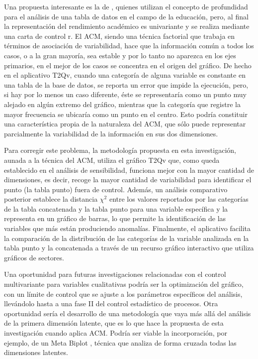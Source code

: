 \documentclass[mathematics,article,submit,moreauthors,pdftex]{mdpi}
\begin{document}
Una propuesta interesante es la de \citet{Saltos2020}, quienes utilizan
el concepto de profundidad para el análisis de una tabla de datos en el
campo de la educación, pero, al final la representación del rendimiento
académico es univariante y se realiza mediante una carta de control r.
El ACM, siendo una técnica factorial que trabaja en términos de
asociación de variabilidad, hace que la información común a todos los
casos, o a la gran mayoría, sea estable y por lo tanto no aparezca en
los ejes primarios, en el mejor de los casos se concentra en el origen
del gráfico. De hecho en el aplicativo T2Qv, cuando una categoría de
alguna variable es constante en una tabla de la base de datos, se
reporta un error que impide la ejecución, pero, si hay por lo menos un
caso diferente, éste se representaría como un punto muy alejado en algún
extremo del gráfico, mientras que la categoría que registre la mayor
frecuencia se ubicaría como un punto en el centro. Esto podría
constituir una característica propia de la naturaleza del ACM, que sólo
puede representar parcialmente la variabilidad de la información en sus
dos dimensiones.

Para corregir este problema, la metodología propuesta en esta
investigación, aunada a la técnica del ACM, utiliza el gráfico T2Qv que,
como queda establecido en el análisis de sensibilidad, funciona mejor
con la mayor cantidad de dimensiones, es decir, recoge la mayor cantidad
de variabilidad para identificar el punto (la tabla punto) fuera de
control. Además, un análisis comparativo posterior establece la
distancia \(\chi^{2}\) entre los valores reportados por las categorías
de la tabla concatenada y la tabla punto para una variable específica y
la representa en un gráfico de barras, lo que permite la identificación
de las variables que más están produciendo anomalías. Finalmente, el
aplicativo facilita la comparación de la distribución de las categorías
de la variable analizada en la tabla punto y la concatenada a través de
un recurso gráfico interactivo que utiliza gráficos de sectores.

Una oportunidad para futuras investigaciones relacionadas con el control
multivariante para variables cualitativas podría ser la optimización del
gráfico, con un límite de control que se ajuste a los parámetros
específicos del análisis, llevándolo hasta a una fase II del control
estadístico de procesos. Otra oportunidad sería el desarrollo de una
metodología que vaya más allá del análisis de la primera dimensión
latente, que es lo que hace la propuesta de esta investigación cuando
aplica ACM. Podría ser viable la incorporación, por ejemplo, de un Meta
Biplot \citep{galindojk} , técnica que analiza de forma cruzada todas
las dimensiones latentes.
\end{document}
